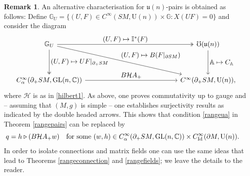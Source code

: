 \documentclass[JEP,XML,SOM,Unicode,published]{cedram}
\newcommand\mto{\mathchoice{\longmapsto}{\mapsto}{\mapsto}{\mapsto}}
\let\ts\textstyle
\DeclareMathOperator{\GL}{GL}
\newcommand{\rU}{\mathrm{U}}
\theoremstyle{plain}
\theoremstyle{definition}
\newtheorem{remark}[theorem]{Remark}
\newcommand{\A}{\mathbb{A}}
\newcommand{\G}{\mathbb{G}}
\newcommand{\I}{\mathbb{I}}
\newcommand{\C}{\mathbb{C}}
\renewcommand{\H}{\mathcal{H}}
\renewcommand{\u}{\mathfrak{u}}
\newcommand{\Id}{\mathrm{Id}}
\newcommand{\1}{{\bf 1}}
\let\lact\triangleright
\begin{document}
\begin{remark} \label{alternative1} An alternative characterisation for $\u(n)$-pairs is obtained as follows: Define
$
\G_U = \{(U,F)\in C^\infty(SM,\rU(n))\times \G: X(UF)=0\}
$ and consider the diagram
\begin{equation}\label{magicdiagram4}
\begin{tikzcd}[row sep=huge, column sep = 4.8cm]
\G_U\arrow[two heads]{r}{\ts(U,F)\mto \I^*(F)} \arrow{dr}{\ts(U,F)\mto B(F\vert_{\partial SM})}\arrow[two heads]{d}{\ts(U,F)\mto UF\vert_{\partial_+SM}} & \mho(\u(n)) \arrow{d}{\ts\A\mto C_\A} \\
C_\alpha^\infty(\partial_+SM,\GL(n,\C)) \arrow{r}{\ts B\H A_+ } & C^\infty(\partial_+SM,\rU(n)),
\end{tikzcd}
\end{equation}
where $\H$ is as in \eqref{hilbert1}.
As above, one proves commutativity up to gauge and -- assuming that $(M,g)$ is simple -- one establishes surjectivity results as indicated by the double headed arrows. This shows that condition \eqref{rangeua} in Theorem \ref{rangepairs} can be replaced by
\begin{equation*}
\hspace{-1em} q=h\lact (B\H A_+w) \quad \text{for some } (w,h)\in C_\alpha^\infty(\partial_+SM,\GL(n,\C)) \times C^\infty_\Id(\partial M,\rU(n)).
\end{equation*}
In order to isolate connections and matrix fields one can use the same ideas that lead to Theorems \ref{rangeconnection} and \ref{rangefields}; we leave the details to the reader.
\end{remark}
\end{document}
